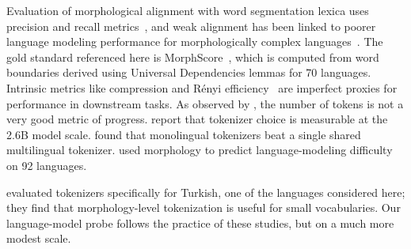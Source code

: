 Evaluation of morphological alignment with word segmentation lexica uses precision and recall metrics~\cite{arnett2025morphscore,batsuren2024evaluating}, and weak alignment has been linked to poorer language modeling performance for morphologically complex languages~\cite{arnett2025why}.
The gold standard referenced here is MorphScore~\cite{arnett2025morphscore}, which is computed from word boundaries derived using Universal Dependencies lemmas for 70 languages.
Intrinsic metrics like compression and R\'enyi efficiency~\cite{zouhar2023noiseless} are imperfect proxies for performance in downstream tasks.
As observed by \citet{schmidt2024tokenization}, the number of tokens is not a very good metric of progress.
\citet{ali2024tokenizer} report that tokenizer choice is measurable at the 2.6B model scale.
\citet{rust2021tokenizer} found that monolingual tokenizers beat a single shared multilingual tokenizer.
\citet{park2021morphology} used morphology to predict language-modeling difficulty on 92 languages.

\citet{toraman2023tokenization} evaluated tokenizers specifically for Turkish, one of the languages considered here; they find that morphology-level tokenization is useful for small vocabularies.
Our language-model probe follows the practice of these studies, but on a much more modest scale.
